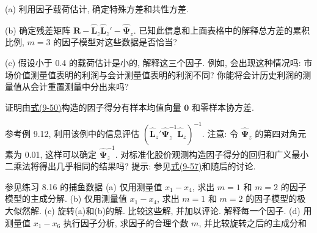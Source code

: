 (a) 利用因子载荷估计, 确定特殊方差和共性方差.

(b) 确定残差矩阵 $\mathbf{R}-\hat{\mathbf{L}}_z\hat{\mathbf{L}}_z'-\hat{\boldsymbol{\Psi}}_z$. 已知此信息和上面表格中的解释总方差的累积比例, $m=3$ 的因子模型对这些数据是否恰当?

(c) 假设小于 0.4 的载荷估计是小的, 解释这三个因子. 例如, 会出现这种情况吗: 市场价值测量值表明的利润与会计测量值表明的利润不同? 你能将会计历史利润的测量值从会计重置测量中分出来吗?

\quad 证明由\hyperref[eq:9-50]{式(9-50)}构造的因子得分有样本均值向量 $\mathbf{0}$ 和零样本协方差.

\quad 参考例 9.12, 利用该例中的信息评估 $(\hat{\mathbf{L}}_z'\hat{\boldsymbol{\Psi}}_z^{-1}\hat{\mathbf{L}}_z)^{-1}$. 注意: 令 $\hat{\boldsymbol{\Psi}}_z$ 的第四对角元素为 0.01, 这样可以确定 $\hat{\boldsymbol{\Psi}}_z^{-1}$. 对标准化股价观测构造因子得分的回归和广义最小二乘法将得出几乎相同的结果吗? 提示: 参见\hyperref[eq:9-57]{式(9-57)}和随后的讨论.


\quad 参见练习 8.16 的捕鱼数据
(a) 仅用测量值 $x_1-x_4$, 求出 $m=1$ 和 $m=2$ 的因子模型的主成分解.
(b) 仅用测量值 $x_1-x_4$, 求出 $m=1$ 和 $m=2$ 的因子模型的极大似然解.
(c) 旋转(a)和(b)的解. 比较这些解, 并加以评论. 解释每一个因子.
(d) 用测量值 $x_1-x_6$ 执行因子分析, 求因子的合理个数 $m$, 并比较旋转之后的主成分和

